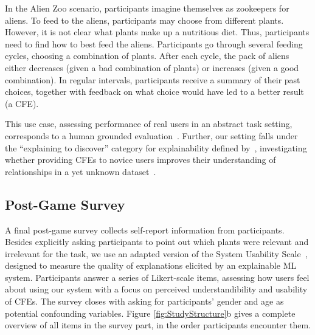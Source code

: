 In the Alien Zoo scenario, participants imagine themselves as zookeepers for aliens. 
To feed to the aliens, participants may choose from different plants. 
However, it is not clear what plants make up a nutritious diet. 
Thus, participants need to find how to best feed the aliens. 
Participants go through several feeding cycles, choosing a combination of plants. 
After each cycle, the pack of aliens either decreases (given a bad combination of plants) or increases (given a good combination). 
In regular intervals, participants receive a summary of their past choices, together with feedback on what choice would have led to a better result (\ie a \gls{CFE}).


This use case, assessing performance of real users in an abstract task setting, corresponds to a human grounded evaluation~\citep{doshi-velez_towards_2017}.
Further, our setting falls under the ``explaining to discover'' category for explainability defined by~\citeauthor{adadi_peeking_2018}, investigating whether providing \glspl{CFE} to novice users improves their understanding of relationships in a yet unknown dataset~\citep{adadi_peeking_2018}.


\subsection{Post-Game Survey}

A final post-game survey collects self-report information from participants.
Besides explicitly asking participants to point out which plants were relevant and irrelevant for the task, we use an adapted version of the System Usability Scale~\citep{holzinger_measuring_2020}, designed to measure the quality of explanations elicited by an explainable \gls{ML} system.
Participants answer a series of Likert-scale items, assessing how users feel about using our system with a focus on perceived understandibility and usability of \glspl{CFE}.
The survey closes with asking for participants' gender and age as potential confounding variables.
Figure \ref{fig:StudyStructure}b gives a complete overview of all items in the survey part, in the order participants encounter them.

